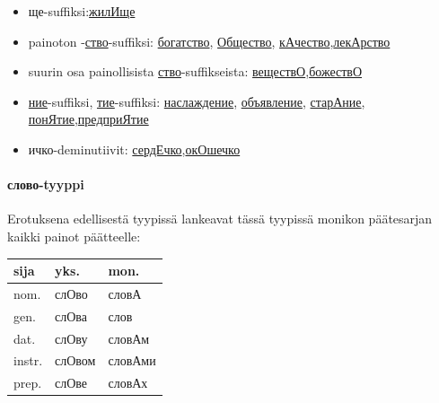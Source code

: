 \documentclass[]{scrartcl}
\providecommand{\tightlist}{%
  \setlength{\itemsep}{0pt}\setlength{\parskip}{0pt}}
\begin{document}
\begin{itemize}
\tightlist
\item
  ще-suffiksi:\href{http://ru.wiktionary.org/wiki/жилище}{жилИще}
\item
  painoton -\href{http://ru.wiktionary.org/wiki/ство}{ство}-suffiksi:
  \href{http://ru.wiktionary.org/wiki/богатство}{богатство},
  \href{http://ru.wiktionary.org/wiki/общество}{Общество},
  \href{http://ru.wiktionary.org/wiki/качество}{кАчество},\href{http://ru.wiktionary.org/wiki/лекарство}{лекАрство}
\item
  suurin osa painollisista
  \href{http://ru.wiktionary.org/wiki/ство}{ство}-suffikseista:
  \href{http://ru.wiktionary.org/wiki/вещество}{веществО},\href{http://ru.wiktionary.org/wiki/божество}{божествО}
\item
  \href{http://ru.wiktionary.org/wiki/ние}{ние}-suffiksi,
  \href{http://ru.wiktionary.org/wiki/тие}{тие}-suffiksi:
  \href{http://ru.wiktionary.org/wiki/наслаждение}{наслаждение},
  \href{http://ru.wiktionary.org/wiki/объявление}{объявление},
  \href{http://ru.wiktionary.org/wiki/старание}{старАние},
  \href{http://ru.wiktionary.org/wiki/понятие}{понЯтие},\href{http://ru.wiktionary.org/wiki/предприятие}{предприЯтие}
\item
  ичко-deminutiivit:
  \href{http://ru.wiktionary.org/wiki/сердечко}{сердЕчко},\href{http://ru.wiktionary.org/wiki/окошечко}{окОшечко}
\end{itemize}

\paragraph{слово-tyyppi}\label{ux441ux43bux43eux432ux43e-tyyppi}

Erotuksena edellisestä tyypissä lankeavat tässä tyypissä monikon
päätesarjan kaikki painot päätteelle:

\begin{longtable}[c]{@{}lll@{}}
\toprule
sija & yks. & mon.\tabularnewline
\midrule
\endhead
nom. & слОво & словА\tabularnewline
gen. & слОва & слов\tabularnewline
dat. & слОву & словАм\tabularnewline
instr. & слОвом & словАми\tabularnewline
prep. & слОве & словАх\tabularnewline
\bottomrule
\end{longtable}
\end{document}
